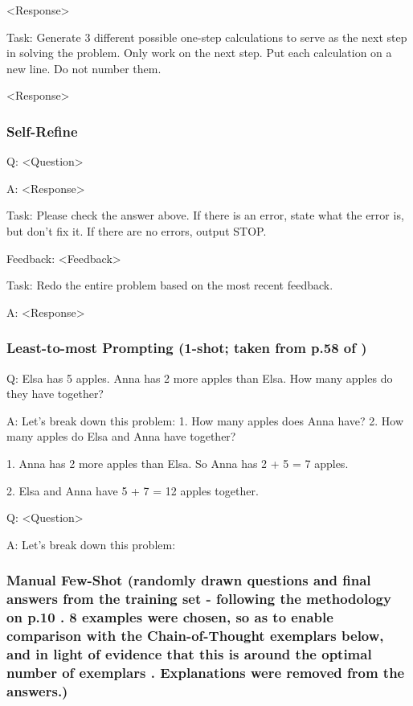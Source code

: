 \documentclass[11pt]{article}
\begin{document}
<Response>

Task: Generate 3 different possible one-step calculations to serve as the next step in solving the problem. Only work on the next step. Put each calculation on a new line. Do not number them.

<Response>

\subsubsection*{Self-Refine}

Q: <Question>

A: <Response>

Task: Please check the answer above. If there is an error, state what the error is, but don't fix it. If there are no errors, output STOP.

Feedback: <Feedback>

Task: Redo the entire problem based on the most recent feedback.

A: <Response>

\subsubsection*{Least-to-most Prompting (1-shot; taken from p.58 of \citealp{zhou_least--most_2023})}

Q: Elsa has 5 apples. Anna has 2 more apples than Elsa. How many apples do they have together?

A: Let's break down this problem: 1. How many apples does Anna have? 2. How many apples do Elsa and Anna have together?

1. Anna has 2 more apples than Elsa. So Anna has 2 + 5 = 7 apples.

2. Elsa and Anna have 5 + 7 = 12 apples together.

Q: <Question>

A: Let's break down this problem:

\subsubsection*{Manual Few-Shot (randomly drawn questions and final answers from the training set - following the methodology on p.10 \citealp{brown_language_2020}. 8 examples were chosen, so as to enable comparison with the Chain-of-Thought exemplars below, and in light of evidence that this is around the optimal number of exemplars \cite{min_rethinking_2022}. Explanations were removed from the answers.)}
\end{document}

